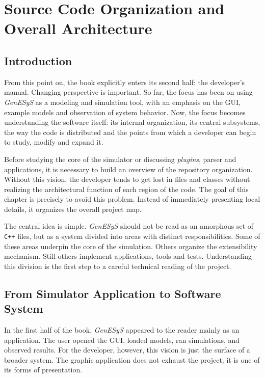 \chapter{Source Code Organization and Overall Architecture}
\label{chap:organizacao_codigo_fonte_arquitetura_geral}

\section{Introduction}
\label{sec:cap6_introducao}

From this point on, the book explicitly enters its second half: the developer's manual. Changing perspective is important. So far, the focus has been on using \textit{GenESyS} as a modeling and simulation tool, with an emphasis on the GUI, example models and observation of system behavior. Now, the focus becomes understanding the software itself: its internal organization, its central subsystems, the way the code is distributed and the points from which a developer can begin to study, modify and expand it.

Before studying the core of the simulator or discussing \textit{plugins}, parser and applications, it is necessary to build an overview of the repository organization. Without this vision, the developer tends to get lost in files and classes without realizing the architectural function of each region of the code. The goal of this chapter is precisely to avoid this problem. Instead of immediately presenting local details, it organizes the overall project map.

The central idea is simple. \textit{GenESyS} should not be read as an amorphous set of \texttt{C++} files, but as a system divided into areas with distinct responsibilities. Some of these areas underpin the core of the simulation. Others organize the extensibility mechanism. Still others implement applications, tools and tests. Understanding this division is the first step to a careful technical reading of the project.

\section{From Simulator Application to Software System}
\label{sec:cap6_do_simulador_como_aplicacao_ao_software}

In the first half of the book, \textit{GenESyS} appeared to the reader mainly as an application. The user opened the GUI, loaded models, ran simulations, and observed results. For the developer, however, this vision is just the surface of a broader system. The graphic application does not exhaust the project; it is one of its forms of presentation.

